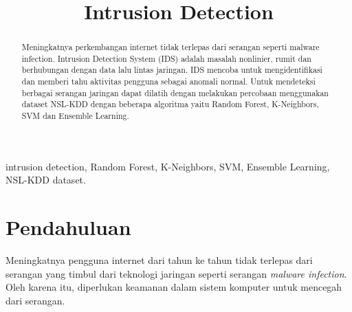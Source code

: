 \documentclass[conference]{IEEEtran}
\begin{document}
\title{Intrusion Detection\\
}

\author{
\and
{}
\and
{}
}

\maketitle

\begin{abstract}
Meningkatnya perkembangan internet tidak terlepas dari serangan seperti malware infection. Intrusion Detection System (IDS) adalah masalah nonlinier, rumit dan berhubungan dengan data lalu lintas jaringan. IDS mencoba untuk mengidentifikasi dan memberi tahu aktivitas pengguna sebagai anomali normal. Untuk mendeteksi berbagai serangan jaringan dapat dilatih dengan melakukan percobaan menggunakan dataset NSL-KDD\cite{ndd} dengan beberapa algoritma yaitu Random Forest, K-Neighbors\cite{liao}, SVM dan Ensemble Learning.
\end{abstract}

\begin{IEEEkeywords}
intrusion detection, Random Forest, K-Neighbors, SVM, Ensemble Learning, NSL-KDD dataset.
\end{IEEEkeywords}

\section{Pendahuluan}
Meningkatnya pengguna internet dari tahun ke tahun tidak terlepas dari serangan yang timbul dari teknologi jaringan seperti serangan \emph{malware infection}. Oleh karena itu, diperlukan keamanan dalam sistem komputer untuk mencegah dari serangan.
\end{document}

